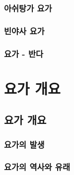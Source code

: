 \documentclass[12pt, a4paper, oneside]{book}
\let\stdsection\section
\renewcommand\section{\newpage\stdsection}
\begin{document}
	\section{아쉬탕가 요가}



	\section{빈야사 요가}



	\section{요가 - 반다}







	\part{요가 개요}
	\noptcrule
	\parttoc				


\chapter{요가 개요}
\minitoc%

%
%
%
\newpage
\section{요가의 발생}


%
%
%
\newpage
\section{요가의 역사와 유래}
\end{document}
